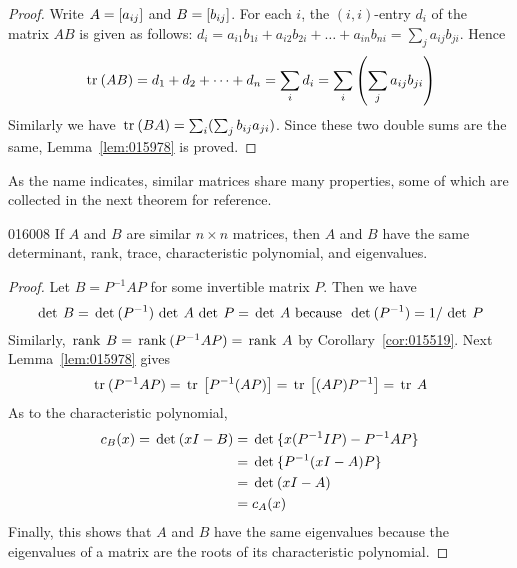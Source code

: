 \begin{proof}
Write $A = \left[ a_{ij} \right]$ and $B = \left[ b_{ij} \right]$. For each $i$, the $(i, i)$-entry $d_{i}$ of the matrix $AB$ is given as follows: $d_{i} = a_{i1}b_{1i} + a_{i2}b_{2i} + \dots + a_{in}b_{ni} = \sum_{j}a_{ij}b_{ji}$. Hence
\begin{equation*}
\thinspace\operatorname{tr\medspace}(AB) = d_1 + d_2 + \dots + d_n = \sum_{i}d_i = \sum_{i}\left(\sum_{j}a_{ij}b_{ji}\right)
\end{equation*}
Similarly we have $\thinspace\operatorname{tr\medspace}(BA) = \sum_{i}(\sum_{j}b_{ij}a_{ji})$. Since these two double sums are the same, Lemma~\ref{lem:015978} is proved.
\end{proof}

As the name indicates, similar matrices share many properties, some of which are collected in the next theorem for reference.

\begin{theorem}{}{016008} %
If $A$ and $B$ are similar $n \times n$ matrices, then $A$ and $B$ have the same determinant, rank, trace, characteristic polynomial, and eigenvalues.
\end{theorem}

\begin{proof}
Let $B = P^{-1}AP$ for some invertible matrix $P$. Then we have
\begin{equation*}
\thinspace\operatorname{det\medspace} B = \thinspace\operatorname{det\medspace}(P^{-1}) \thinspace\operatorname{det\medspace} A \thinspace\operatorname{det\medspace} P = \thinspace\operatorname{det\medspace} A\mbox{ because }\thinspace\operatorname{det\medspace}(P^{-1}) = 1/ \thinspace\operatorname{det\medspace} P
\end{equation*}
Similarly, $\thinspace\operatorname{rank\medspace} B = \thinspace\operatorname{rank\medspace}(P^{-1}AP) = \thinspace\operatorname{rank\medspace} A$ by Corollary~\ref{cor:015519}. Next Lemma~\ref{lem:015978} gives
\begin{equation*}
\thinspace\operatorname{tr\medspace} (P^{-1}AP) = \thinspace\operatorname{tr\medspace}\left[ P^{-1}(AP)\right] = \thinspace\operatorname{tr\medspace}\left[ (AP)P^{-1}\right] = \thinspace\operatorname{tr \medspace} A
\end{equation*}
As to the characteristic polynomial,
\begin{align*}
c_B(x) = \thinspace\operatorname{det\medspace}(xI - B) &= \thinspace\operatorname{det\medspace} \{x(P^{-1}IP) - P^{-1}AP\} \\
&= \thinspace\operatorname{det\medspace} \{ P^{-1}(xI - A)P\} \\
&= \thinspace\operatorname{det\medspace} (xI - A) \\
&= c_A(x)
\end{align*}
Finally, this shows that $A$ and $B$ have the same eigenvalues because the eigenvalues of a matrix are the roots of its characteristic polynomial.
\end{proof}


